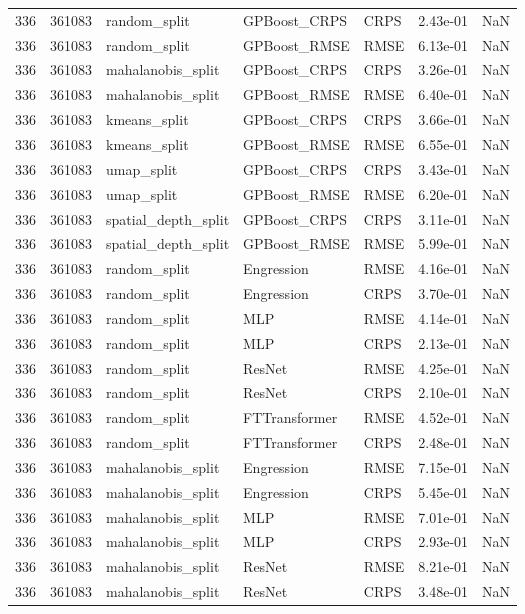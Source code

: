\begin{tabular}{rrlllrr}
336 & 361083 & random\_split & GPBoost\_CRPS & CRPS & 2.43e-01 & NaN \\
336 & 361083 & random\_split & GPBoost\_RMSE & RMSE & 6.13e-01 & NaN \\
336 & 361083 & mahalanobis\_split & GPBoost\_CRPS & CRPS & 3.26e-01 & NaN \\
336 & 361083 & mahalanobis\_split & GPBoost\_RMSE & RMSE & 6.40e-01 & NaN \\
336 & 361083 & kmeans\_split & GPBoost\_CRPS & CRPS & 3.66e-01 & NaN \\
336 & 361083 & kmeans\_split & GPBoost\_RMSE & RMSE & 6.55e-01 & NaN \\
336 & 361083 & umap\_split & GPBoost\_CRPS & CRPS & 3.43e-01 & NaN \\
336 & 361083 & umap\_split & GPBoost\_RMSE & RMSE & 6.20e-01 & NaN \\
336 & 361083 & spatial\_depth\_split & GPBoost\_CRPS & CRPS & 3.11e-01 & NaN \\
336 & 361083 & spatial\_depth\_split & GPBoost\_RMSE & RMSE & 5.99e-01 & NaN \\
336 & 361083 & random\_split & Engression & RMSE & 4.16e-01 & NaN \\
336 & 361083 & random\_split & Engression & CRPS & 3.70e-01 & NaN \\
336 & 361083 & random\_split & MLP & RMSE & 4.14e-01 & NaN \\
336 & 361083 & random\_split & MLP & CRPS & 2.13e-01 & NaN \\
336 & 361083 & random\_split & ResNet & RMSE & 4.25e-01 & NaN \\
336 & 361083 & random\_split & ResNet & CRPS & 2.10e-01 & NaN \\
336 & 361083 & random\_split & FTTransformer & RMSE & 4.52e-01 & NaN \\
336 & 361083 & random\_split & FTTransformer & CRPS & 2.48e-01 & NaN \\
336 & 361083 & mahalanobis\_split & Engression & RMSE & 7.15e-01 & NaN \\
336 & 361083 & mahalanobis\_split & Engression & CRPS & 5.45e-01 & NaN \\
336 & 361083 & mahalanobis\_split & MLP & RMSE & 7.01e-01 & NaN \\
336 & 361083 & mahalanobis\_split & MLP & CRPS & 2.93e-01 & NaN \\
336 & 361083 & mahalanobis\_split & ResNet & RMSE & 8.21e-01 & NaN \\
336 & 361083 & mahalanobis\_split & ResNet & CRPS & 3.48e-01 & NaN \\

\end{tabular}
